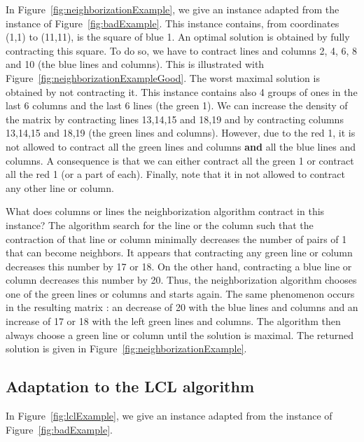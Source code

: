 In Figure~\ref{fig:neighborizationExample}, we give an instance adapted from the instance of Figure~\ref{fig:badExample}. This instance contains, from coordinates (1,1) to (11,11), is the square of blue 1. An optimal solution is obtained by fully contracting this square. To do so, we have to contract lines and columns 2, 4, 6, 8 and 10 (the blue lines and columns). This is illustrated with Figure~\ref{fig:neighborizationExampleGood}. The worst maximal solution is obtained by not contracting it. This instance contains also 4 groups of ones in the last 6 columns and the last 6 lines (the green 1). We can increase the density of the matrix by contracting lines 13,14,15 and 18,19 and by contracting columns 13,14,15 and 18,19 (the green lines and columns). However, due to the red 1, it is not allowed to contract all the green lines and columns \textbf{and} all the blue lines and columns. A consequence is that we can either contract all the green 1 or contract all the red 1 (or a part of each). Finally, note that it in not allowed to contract any other line or column.

What does columns or lines the neighborization algorithm contract in this instance? The algorithm search for the line or the column such that the contraction of that line or column minimally decreases the number of pairs of 1 that can become neighbors. It appears that contracting any green line or column decreases this number by 17 or 18. On the other hand, contracting a blue line or column decreases this number by 20. Thus, the neighborization algorithm chooses one of the green lines or columns and starts again. The same phenomenon occurs in the resulting matrix : an decrease of 20 with the blue lines and columns and an increase of 17 or 18 with the left green lines and columns. The algorithm then always choose a green line or column until the solution is maximal. The returned solution is given in Figure~\ref{fig:neighborizationExample}.


\renewcommand{\gridsize}{0.5}




\subsection{Adaptation to the LCL algorithm}
\renewcommand{\gridsize}{0.35}

In Figure~\ref{fig:lclExample}, we give an instance adapted from the instance of Figure~\ref{fig:badExample}.


